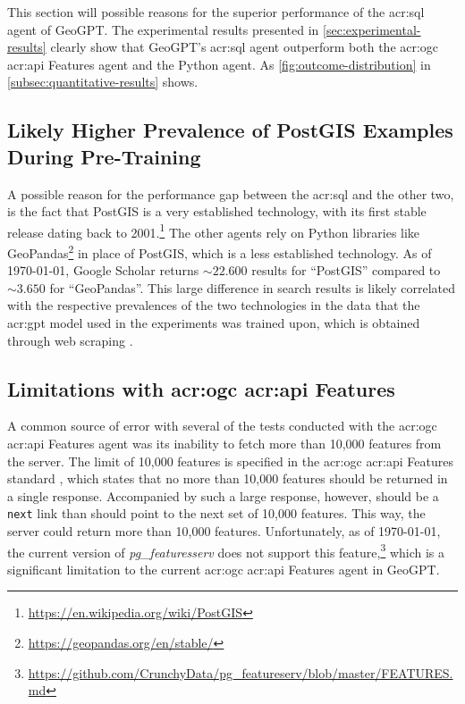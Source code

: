 This section will possible reasons for the superior performance of the \acrshort{acr:sql} agent of GeoGPT. The experimental results presented in \autoref{sec:experimental-results} clearly show that GeoGPT's \acrshort{acr:sql} agent outperform both the \acrshort{acr:ogc} \acrshort{acr:api} Features agent and the Python agent. As \autoref{fig:outcome-distribution} in \autoref{subsec:quantitative-results} shows.

\subsection{Likely Higher Prevalence of PostGIS Examples During Pre-Training}

A possible reason for the performance gap between the \acrshort{acr:sql} and the other two, is the fact that PostGIS is a very established technology, with its first stable release dating back to 2001.\footnote{\url{https://en.wikipedia.org/wiki/PostGIS}} The other agents rely on Python libraries like GeoPandas\footnote{\url{https://geopandas.org/en/stable/}} in place of PostGIS, which is a less established technology. As of \today, Google Scholar returns $\sim 22.600$ results for \enquote{PostGIS} compared to  $\sim 3.650$ for \enquote{GeoPandas}. This large difference in search results is likely correlated with the respective prevalences of the two technologies in the data that the \acrshort{acr:gpt} model used in the experiments was trained upon, which is obtained through web scraping \citep[3]{radfordLanguageModelsAre2019}.

\subsection[Limitations with OGC API Features]{Limitations with \acrshort{acr:ogc} \acrshort{acr:api} Features}
\label{subsec:difficulties-with-oaf}

A common source of error with several of the tests conducted with the \acrshort{acr:ogc} \acrshort{acr:api} Features agent was its inability to fetch more than 10,000 features from the server. The limit of 10,000 features is specified in the \acrshort{acr:ogc} \acrshort{acr:api} Features standard \citep{opengeospatialconsortiumOGCAPIFeatures2022}, which states that no more than 10,000 features should be returned in a single response. Accompanied by such a large response, however, should be a \texttt{next} link than should point to the next set of 10,000 features. This way, the server could return more than 10,000 features. Unfortunately, as of \today, the current version of \textit{pg\_featuresserv} does not support this feature,\footnote{\url{https://github.com/CrunchyData/pg_featureserv/blob/master/FEATURES.md}} which is a significant limitation to the current \acrshort{acr:ogc} \acrshort{acr:api} Features agent in GeoGPT.

